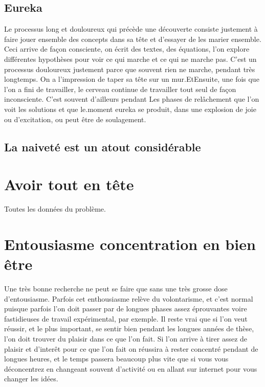 \documentclass[24pt]{article}
\begin{document}
\subsection{Eureka}
Le processus long et douloureux qui précède une découverte consiste justement à faire jouer ensemble des concepts dans sa tête et d'essayer de les marier ensemble.  Ceci arrive de façon consciente, on écrit des textes, des équations, l'on explore différentes hypothèses pour voir ce qui marche et ce qui ne marche pas. C'est un processus douloureux justement parce que souvent rien ne marche, pendant très longtemps. On a l'impression de taper sa tête sur un mur.EtEnsuite, une fois que l'on a fini de travailler, le cerveau continue de travailler tout seul de façon inconsciente. C'est souvent d'ailleurs pendant 
    Les phases de relâchement que l'on voit les solutions et que le.moment eureka se produit, dans une explosion de joie ou d'excitation, ou peut être de soulagement. 







\subsection{La naiveté est un atout considérable}




\section{Avoir tout en tête}
Toutes les données du problème. 


\section{Entousiasme concentration en bien être}

Une très bonne recherche ne peut se faire que sans une très grosse dose d'entousiasme. Parfois cet enthousiasme relève du volontarisme, et c'est normal puisque parfois l'on doit passer par de longues phases assez éprouvantes voire fastidieuses de travail expérimental, par exemple. Il reste vrai que si l'on veut réussir, et le plus important, se sentir bien pendant les longues années de thèse, l'on doit trouver du plaisir dans ce que l'on fait. Si l'on arrive à tirer assez de plaisir et d'interêt pour ce que l'on fait on réussira à rester concentré pendant de longues heures, et le temps passera beaucoup plus vite que si vous vous déconcentrez en changeant souvent d'activité ou en allant sur internet pour vous changer les idées.
\end{document}
